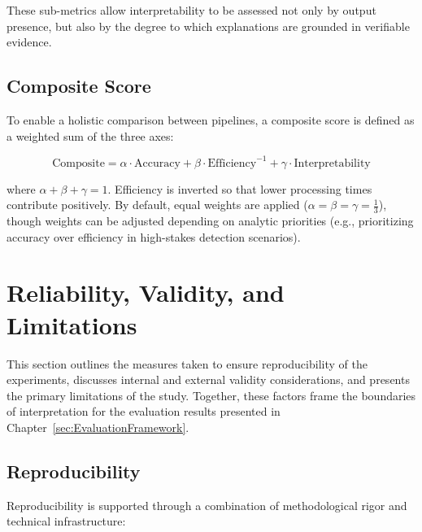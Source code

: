 These sub-metrics allow interpretability to be assessed not only by output presence, but also by
the degree to which explanations are grounded in verifiable evidence.

\subsection{Composite Score}\label{subsec:CompositeScore}

To enable a holistic comparison between pipelines, a composite score is defined as a weighted sum
of the three axes:

\begin{equation}
      \text{Composite} = \alpha \cdot \text{Accuracy}
      + \beta \cdot \text{Efficiency}^{-1}
      + \gamma \cdot \text{Interpretability}
\end{equation}

where \(\alpha + \beta + \gamma = 1\). Efficiency is inverted so that lower processing times
contribute positively. By default, equal weights are applied (\(\alpha = \beta = \gamma =
\tfrac{1}{3}\)), though weights can be adjusted depending on analytic priorities (e.g.,
prioritizing accuracy over efficiency in high-stakes detection scenarios).

\section{Reliability, Validity, and Limitations}\label{sec:ReliabilityValidityLimitations}
This section outlines the measures taken to ensure reproducibility of the experiments, discusses
internal and external validity considerations, and presents the primary limitations of the study.
Together, these factors frame the boundaries of interpretation for the evaluation results presented
in Chapter~\ref{sec:EvaluationFramework}.

\subsection{Reproducibility}\label{subsec:Reproducibility}
Reproducibility is supported through a combination of methodological rigor and technical
infrastructure:

